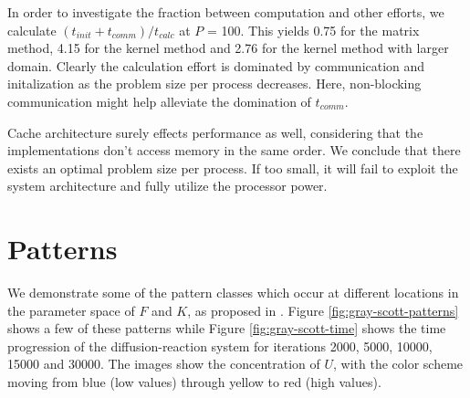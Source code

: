 \documentclass[a4paper,11pt]{article}
\begin{document}
In order to investigate the fraction between computation and other efforts, we calculate $(t_{init}+t_{comm})/t_{calc}$ at $P$ = 100. This yields 0.75 for the matrix method, 4.15 for the kernel method and 2.76 for the kernel method with larger domain. Clearly the calculation effort is dominated by communication and initalization as the problem size per process decreases. Here, non-blocking communication might help alleviate the domination of $t_{comm}$.

Cache architecture surely effects performance as well, considering that the implementations don't access memory in the same order. We conclude that there exists an optimal problem size per process. If too small, it will fail to exploit the system architecture and fully utilize the processor power. 

\section*{Patterns}

We demonstrate some of the pattern classes which occur at different locations in the parameter space of $F$ and $K$, as proposed in \cite{Pearson}. Figure \ref{fig:gray-scott-patterns} shows a few of these patterns while Figure \ref{fig:gray-scott-time} shows the time progression of the diffusion-reaction system for iterations 2000, 5000, 10000, 15000 and 30000. The images show the concentration of $U$, with the color scheme moving from blue (low values) through yellow to red (high values). 
\end{document}
